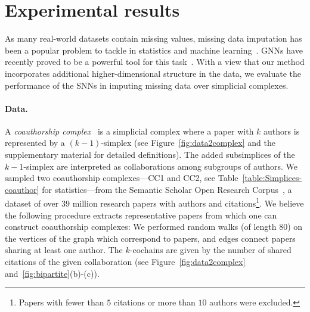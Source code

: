 \section{Experimental results}

As many real-world datasets contain missing values, missing data imputation has been a popular problem to tackle in statistics and machine learning~\cite{little1986statistical, nelwamondo2007missing}.
GNNs have recently proved to be a powerful tool for this task~\cite{spinelli2020neural}.
With a view that our method incorporates additional higher-dimensional structure in the data, we evaluate the performance of the SNNs in imputing missing data over simplicial complexes.

\paragraph{Data.}
A \emph{coauthorship complex}~\cite{patania2017} is a simplicial complex where a paper with $k$ authors is represented by a $(k-1)$-simplex (see Figure~\ref{fig:data2complex} and the supplementary material for detailed definitions). The added subsimplices of the $k-1$-simplex are interpreted as collaborations among subgroups of authors.
We sampled two coauthorship complexes---CC1 and CC2, see Table~\ref{table:Simplices-coauthor} for statistics---from the Semantic Scholar Open Research Corpus~\cite{ammar18NAACL}, a dataset of over $39$ million research papers with authors and citations\footnote{Papers with fewer than $5$ citations or more than $10$ authors were excluded.}.
We believe the following procedure extracts representative papers from which one can construct coauthorship complexes: We performed random walks (of length $80$) on the vertices of the graph which correspond to papers, and edges connect papers sharing at least one author. The $k$-cochains are given by the number of shared citations of the given collaboration (see Figure~\ref{fig:data2complex} and~\ref{fig:bipartite}(b)-(c)).
